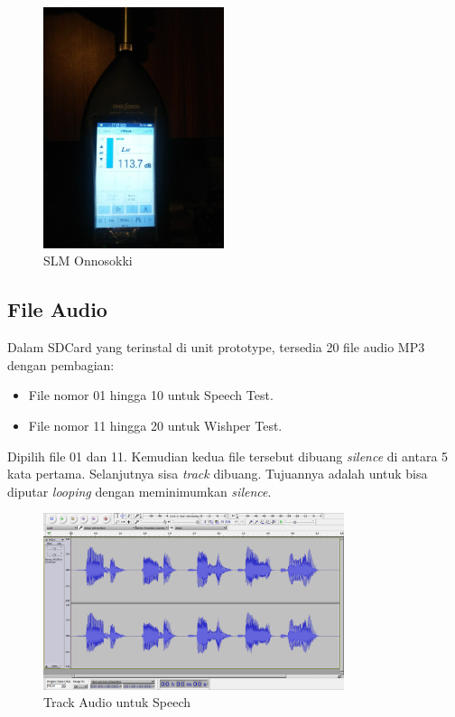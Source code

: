 \documentclass[12pt,]{article}
\begin{document}
\begin{itemize}
		\newpage
		\begin{figure}[!ht]
			\centering
			\includegraphics[width=150pt]{images/slm_calib}
			\caption{SLM Onnosokki}
		\end{figure}
		
	\end{itemize} 

	\subsection{File Audio}
	
	Dalam SDCard yang terinstal di unit prototype, tersedia 20 file audio MP3 dengan pembagian:
	\begin{itemize}
		\item File nomor 01 hingga 10 untuk Speech Test.
		\item File nomor 11 hingga 20 untuk Wishper Test.
	\end{itemize}

	Dipilih file 01 dan 11.
	Kemudian kedua file tersebut dibuang \textit{silence} di antara 5 kata pertama.
	Selanjutnya sisa \textit{track} dibuang.
	Tujuannya adalah untuk bisa diputar \textit{looping} dengan meminimumkan \textit{silence}.
	
	\begin{figure}[!ht]
		\centering
		\includegraphics[width=250pt]{images/elitech_testAudioSpeech}
		\caption{Track Audio untuk Speech}
	\end{figure}
\end{document}
